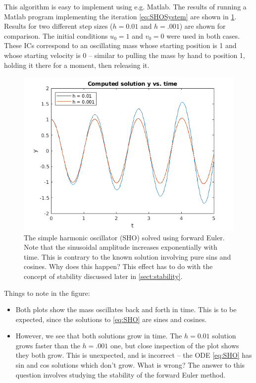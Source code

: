 \documentclass[hidelinks,notitlepage]{book}
\begin{document}
This algorithm is easy to implement using e.g. Matlab.  The results of running a Matlab program implementing the iteration \cref{eq:SHOSystem} are shown in \cref{fig:ForwardEulerSHO}.  Results for two different step sizes ($h = 0.01$ and $h = .001$) are shown for comparison.  The initial conditions $u_0 = 1$ and $v_0 = 0$ were used in both cases.  These ICs correspond to an oscillating mass whose starting position is 1 and whose starting velocity is 0 -- similar to pulling the mass by hand to position 1, holding it there for a moment, then releasing it.  
\begin{figure}[tbh]
	\centering
	\includegraphics[width=0.7\columnwidth]{ForwardEulerSHO.png}
	\caption{The simple harmonic oscillator (SHO) solved using forward Euler.  Note that the sinusoidal amplitude increases exponentially with time.  This is contrary to the known solution involving pure sins and cosines.  Why does this happen? This effect has to do with the concept of stability discussed later in \cref{sect:stability}.}
	\label{fig:ForwardEulerSHO}
\end{figure}
Things to note in the figure:
\begin{itemize}
	\item Both plots show the mass oscillates back and forth in time.  This is to be expected, since the solutions to \cref{eq:SHO} are sines and cosines.
	\item However, we see that both solutions grow in time.  The $h = 0.01$ solution grows faster than the $h = .001$ one, but close inspection of the plot shows they both grow.  This is unexpected, and is incorrect -- the ODE \cref{eq:SHO} has sin and cos solutions which don't grow.  What is wrong?  The answer to this question involves studying the stability of the forward Euler method.
\end{itemize}
\end{document}
